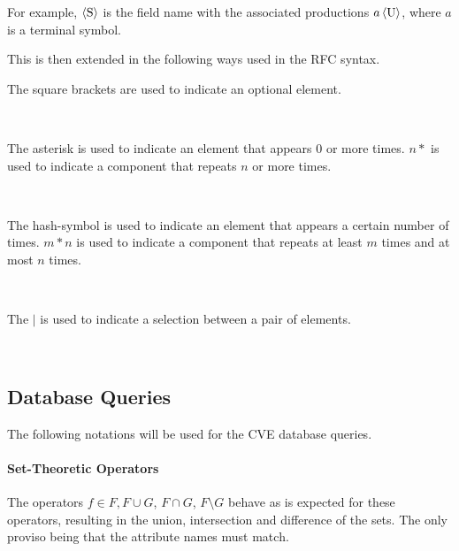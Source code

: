 \begin{bnf*}
\end{bnf*}

For example, $\langle \text S \rangle$ is the field name with the associated
productions $a \, \langle \text U \rangle$, where $a$ is a terminal symbol.

\begin{bnf*}
\end{bnf*}
This is then extended in the following ways used in the RFC syntax.

The square brackets are used to indicate an optional element.
\begin{bnf*}
\\
\end{bnf*}

The asterisk is used to indicate an element that appears 0 or more times. $n*$
is used to indicate a component that repeats $n$ or more times.

\begin{bnf*}
\\
\end{bnf*}

The hash-symbol is used to indicate an element that appears a certain number of
times. $m*n$ is used to indicate a component that repeats at least $m$ times and
at most $n$ times.

\begin{bnf*}
\\
\end{bnf*}

The $|$ is used to indicate a selection between a pair of elements.
\begin{bnf*}
\\
\end{bnf*}

\subsection{Database Queries}
The following notations will be used for the CVE database queries.

\paragraph{Set-Theoretic Operators}
The operators $f\in F, F\cup G$, $F \cap G$, $F\setminus G$ behave as is expected for
these operators, resulting in the union, intersection and difference of the
sets.  The only proviso being that the attribute names must match.

